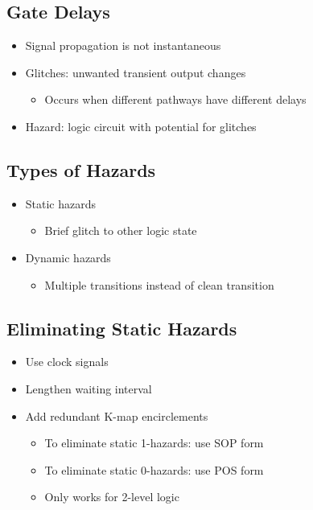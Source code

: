 \documentclass[a4paper]{article}
\begin{document}
\subsection{Gate Delays}
\begin{itemize}
    \item Signal propagation is not instantaneous
    \item Glitches: unwanted transient output changes
    \begin{itemize}[label=$\circ$]
        \item Occurs when different pathways have different delays
    \end{itemize}
    \item Hazard: logic circuit with potential for glitches
\end{itemize}

\subsection{Types of Hazards}
\begin{itemize}
    \item Static hazards
    \begin{itemize}[label=$\circ$]
        \item Brief glitch to other logic state
    \end{itemize}
    \item Dynamic hazards
    \begin{itemize}[label=$\circ$]
        \item Multiple transitions instead of clean transition
    \end{itemize}
\end{itemize}

\subsection{Eliminating Static Hazards}
\begin{itemize}
    \item Use clock signals
    \item Lengthen waiting interval
    \item Add redundant K-map encirclements
    \begin{itemize}[label=$\circ$]
        \item To eliminate static 1-hazards: use SOP form
        \item To eliminate static 0-hazards: use POS form
        \item Only works for 2-level logic
    \end{itemize}
\end{itemize}
\end{document}
